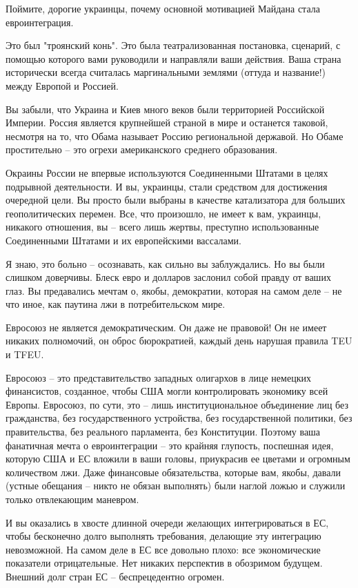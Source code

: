 Поймите, дорогие украинцы, почему основной мотивацией Майдана стала
евроинтеграция.

Это был "троянский конь". Это была театрализованная постановка, сценарий, с
помощью которого вами руководили и направляли ваши действия. Ваша страна
исторически всегда считалась маргинальными землями (оттуда и название!) между
Европой и Россией.

Вы забыли, что Украина и Киев много веков были территорией Российской Империи.
Россия является крупнейшей страной в мире и останется таковой, несмотря на то,
что Обама называет Россию региональной державой. Но Обаме простительно – это
огрехи американского среднего образования.

Окраины России не впервые используются Соединенными Штатами в целях подрывной
деятельности. И вы, украинцы, стали средством для достижения очередной цели. Вы
просто были выбраны в качестве катализатора для больших геополитических
перемен. Все, что произошло, не имеет к вам, украинцы, никакого отношения, вы –
всего лишь жертвы, преступно использованные Соединенными Штатами и их
европейскими вассалами.

Я знаю, это больно – осознавать, как сильно вы заблуждались. Но вы были слишком
доверчивы. Блеск евро и долларов заслонил собой правду от ваших глаз. Вы
предавались мечтам о, якобы, демократии, которая на самом деле – не что иное,
как паутина лжи в потребительском мире.

Евросоюз не является демократическим. Он даже не правовой! Он не имеет никаких
полномочий, он оброс бюрократией, каждый день нарушая правила TEU и TFEU.

Евросоюз – это представительство западных олигархов в лице немецких
финансистов, созданное, чтобы США могли контролировать экономику всей Европы.
Евросоюз, по сути, это – лишь институциональное объединение лиц без
гражданства, без государственного устройства, без государственной политики, без
правительства, без реального парламента, без Конституции. Поэтому ваша
фанатичная мечта о евроинтеграции – это крайняя глупость, поспешная идея,
которую США и ЕС вложили в ваши головы, приукрасив ее цветами и огромным
количеством лжи. Даже финансовые обязательства, которые вам, якобы, давали
(устные обещания – никто не обязан выполнять) были наглой ложью и служили
только отвлекающим маневром.

И вы оказались в хвосте длинной очереди желающих интегрироваться в ЕС, чтобы
бесконечно долго выполнять требования, делающие эту интеграцию невозможной. На
самом деле в ЕС все довольно плохо: все экономические показатели отрицательные.
Нет никаких перспектив в обозримом будущем. Внешний долг стран ЕС –
беспрецедентно огромен.

